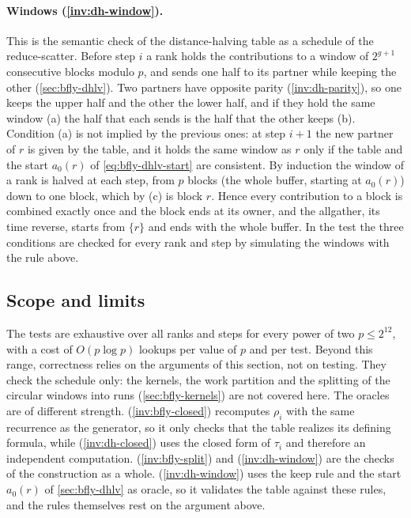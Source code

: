 \paragraph{Windows (\ref{inv:dh-window}).}
This is the semantic check of the distance-halving table as a schedule of the reduce-scatter.
Before step $i$ a rank holds the contributions to a window of $2^{g+1}$ consecutive blocks modulo $p$, and sends one half to its partner while keeping the other (\cref{sec:bfly-dhlv}).
Two partners have opposite parity (\ref{inv:dh-parity}), so one keeps the upper half and the other the lower half, and if they hold the same window (a) the half that each sends is the half that the other keeps (b).
Condition (a) is not implied by the previous ones: at step $i+1$ the new partner of $r$ is given by the table, and it holds the same window as $r$ only if the table and the start $a_0(r)$ of \cref{eq:bfly-dhlv-start} are consistent.
By induction the window of a rank is halved at each step, from $p$ blocks (the whole buffer, starting at $a_0(r)$) down to one block, which by (c) is block $r$.
Hence every contribution to a block is combined exactly once and the block ends at its owner, and the allgather, its time reverse, starts from $\{r\}$ and ends with the whole buffer.
In the test the three conditions are checked for every rank and step by simulating the windows with the rule above.

\subsection{Scope and limits}

The tests are exhaustive over all ranks and steps for every power of two $p\le 2^{12}$, with a cost of $O(p\log p)$ lookups per value of $p$ and per test.
Beyond this range, correctness relies on the arguments of this section, not on testing.
They check the schedule only: the kernels, the work partition and the splitting of the circular windows into runs (\cref{sec:bfly-kernels}) are not covered here.
The oracles are of different strength.
(\ref{inv:bfly-closed}) recomputes $\rho_i$ with the same recurrence as the generator, so it only checks that the table realizes its defining formula, while (\ref{inv:dh-closed}) uses the closed form of $\tau_i$ and therefore an independent computation.
(\ref{inv:bfly-split}) and (\ref{inv:dh-window}) are the checks of the construction as a whole.
(\ref{inv:dh-window}) uses the keep rule and the start $a_0(r)$ of \cref{sec:bfly-dhlv} as oracle, so it validates the table against these rules, and the rules themselves rest on the argument above.

